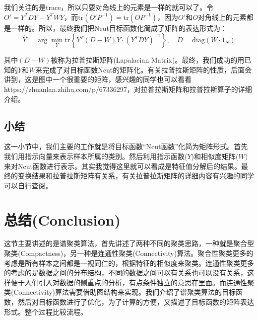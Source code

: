 \documentclass[a4paper]{article}
\begin{document}
我们关注的是trace，所以只要对角线上的元素是一样的就可以了。令$O' = Y^TDY - Y^TWY$，而$\mathrm{tr}(O'P^{-1})=\mathrm{tr}(OP^{-1})$，因为$O'$和$O$对角线上的元素都是一样的。所以，最终我们把Ncut目标函数化简成了矩阵的表达形式为：
\begin{equation}
    \hat{Y} = \arg\min_Y \mathrm{tr}\left\{ Y^T(D-W)Y\cdot (Y^TDY)^{-1} \right\},\quad D = \mathrm{diag}(W\cdot 1_N)
\end{equation}

其中$(D-W)$被称为拉普拉斯矩阵(Lapalacian Matrix)。最终，我们成功的用已知的$Y$和$W$来完成了对目标函数Ncut的矩阵化。有关拉普拉斯矩阵的性质，后面会讲到，这是图中一个很重要的矩阵，感兴趣的同学也可以看看https://zhuanlan.zhihu.com/p/67336297，对拉普拉斯矩阵和拉普拉斯算子的详细介绍。

\subsection{小结}
这一小节中，我们主要的工作就是将目标函数“Ncut函数”化简为矩阵形式。首先我们用指示向量来表示样本所属的类别。然后利用指示函数($Y$)和相似度矩阵($W$)来对Ncut函数进行表示。其实我觉得这里就可以看成是特征值分解后的结果。最终的变换结果和拉普拉斯矩阵有关系，有关拉普拉斯矩阵的详细内容有兴趣的同学可以自行查阅。

\section{总结(Conclusion)}
这节主要讲述的是谱聚类算法，首先讲述了两种不同的聚类思路，一种就是聚合型聚类(Compactness)，另一种是连通性聚类(Connectivity)算法。聚合性聚类更多的考虑是所有样本之间都是一视同仁的，根据特征的相似度来聚类。连通性聚类更多的考虑的是数据之间的分布结构，不同的数据之间可以有关系也可以没有关系，这样便于人们引入对数据的侧重点的分析，有点条件独立的意思在里面。而连通性聚类(Connectivity)算法需要借助图结构来实现。我们介绍了谱聚类算法的目标函数，然后对目标函数进行了优化，为了计算的方便，又描述了目标函数的矩阵表达形式。整个过程比较流程。
\end{document}
